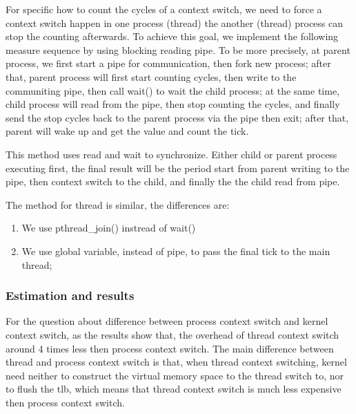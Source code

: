 For specific how to count the cycles of a context switch, we need to force a context switch happen in one process (thread) the another (thread) process can stop the counting afterwards. To achieve this goal, we implement the following measure sequence by using blocking
reading pipe. To be more precisely, at parent process, we first start a pipe for communication, then fork new process; after that, parent process will first start counting cycles, then write to the communiting pipe, then call wait() to wait the child process; at the same time, child process will read from the pipe, then stop counting the cycles, and finally send the stop cycles back to the parent process via the pipe then exit; after that, parent will wake up and get the value and count the tick.

This method uses read and wait to synchronize. Either child or parent process executing first, the final result will be the period start from parent writing to the pipe, then context switch to the child, and finally the the child read from pipe.

The method for thread is similar, the differences are:

\begin{enumerate}
    \item We use pthread\_join() instread of wait()
    \item We use global variable, instead of pipe, to pass the final tick to the main thread;
\end{enumerate}


\subsubsection{Estimation and results}

For the question about difference between process context switch and kernel context switch, as the results show that, the overhead of thread context switch around 4 times less then process context switch. The main difference between thread and process context switch
is that, when thread context switching, kernel need neither to construct the virtual memory space to the thread switch to, nor to flush the tlb, which means that thread context switch is much less expensive then process context switch.

